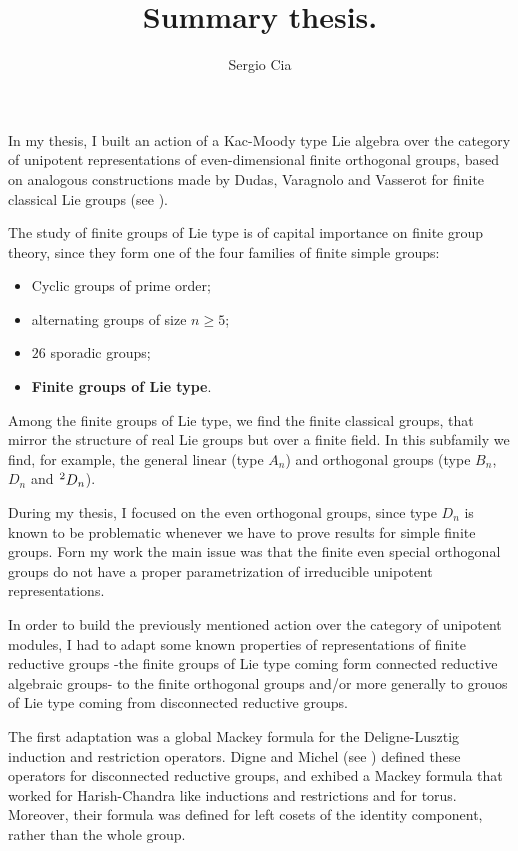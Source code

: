 \documentclass[a4paper,twoside,12pt]{article}
\title{Summary thesis.}
\author{Sergio Cia}
\theoremstyle{tdp}
\theoremstyle{ddp}
\theoremstyle{not}
\begin{document}
 
\maketitle

In my thesis, I built an action of a Kac-Moody type Lie algebra over the category of unipotent representations of even-dimensional finite orthogonal groups, based on analogous constructions made by Dudas, Varagnolo and Vasserot for finite classical Lie groups (see \cite{DVV}).

The study of finite groups of Lie type is of capital importance on finite group theory, since they form one of the four families of finite simple groups: 
\begin{itemize}[label=$\bullet$]
	\item Cyclic groups of prime order;
	\item alternating groups of size $n\geq 5$;
	\item $26$ sporadic groups;
	\item \textbf{Finite groups of Lie type}. 
\end{itemize}

Among the finite groups of Lie type, we find the finite classical groups, that mirror the structure of real Lie groups but over a finite field. In this subfamily we find, for example, the general linear (type $A_n$) and orthogonal groups (type $B_n$, $D_n$ and $\tensor*[^2]{}{}D_n$). %

During my thesis, I focused on the even orthogonal groups, since type $D_n$ is known to be problematic whenever we have to prove results for simple finite groups. Forn my work the main issue was that the finite even special orthogonal groups do not have a proper parametrization of irreducible unipotent representations.

In order to build the previously mentioned action over the category of unipotent modules, I had to adapt some known properties of representations of finite reductive groups -the finite groups of Lie type coming form connected reductive algebraic groups- to the finite orthogonal groups and/or more generally to grouos of Lie type coming from disconnected reductive groups. 

The first adaptation was a global Mackey formula for the Deligne-Lusztig induction and restriction operators. Digne and Michel (see \cite{DiMi}) defined these operators for disconnected reductive groups, and exhibed a Mackey formula that worked for Harish-Chandra like inductions and restrictions and for torus. Moreover, their formula was defined for left cosets of the identity component, rather than the whole group. 
\end{document}
